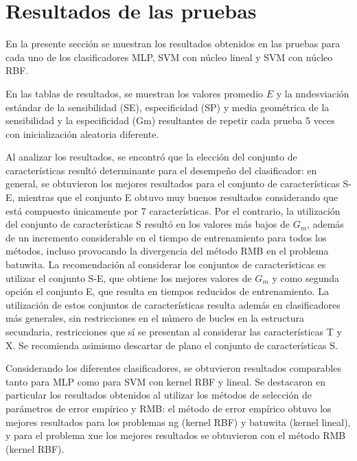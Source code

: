 \documentclass[12pt,bibliography=oldstyle,DIV=12,parskip=half-]{scrreprt}
\begin{document}
%
%
%
\section{Resultados de las pruebas}
%
En la presente sección se muestran los resultados obtenidos en las
pruebas para cada uno de los clasificadores MLP, SVM con núcleo lineal
y SVM con núcleo RBF.

En las tablas de resultados, se muestran los valores promedio $E$ y la
nndesviación estándar de la sensibilidad (SE), especificidad (SP) y
media geométrica de la sensibilidad y la especificidad (Gm)
resultantes de repetir cada prueba 5 veces con inicialización
aleatoria diferente.

Al analizar los resultados, se encontró que la elección del conjunto
de características resultó determinante para
el desempeño del clasificador: en general, se obtuvieron los mejores
resultados para el conjunto de características S-E,
mientras que el conjunto E obtuvo muy buenos resultados considerando
que está compuesto únicamente por 7 características.
Por el contrario, la utilización del conjunto de características S
resultó en los valores más bajos de $G_m$, además de un incremento
considerable en el tiempo de entrenamiento para todos los métodos,
incluso provocando la divergencia del método RMB en el problema
batuwita.
La recomendación al considerar los conjuntos de características es
utilizar el conjunto S-E, que obtiene los mejores valores de $G_m$ y
como segunda opción el conjunto E, que resulta en tiempos reducidos de
entrenamiento.  La utilización de estos conjuntos de características
resulta además en clasificadores más generales, sin restricciones en
el número de bucles en la estructura secundaria, restricciones que sí
se presentan al considerar las características T y X.  Se recomienda
asimismo descartar de plano el conjunto de características S.

Considerando los diferentes clasificadores, se obtuvieron resultados
comparables tanto para MLP como para SVM con kernel RBF y lineal.  Se
destacaron en particular los resultados obtenidos al utilizar los
métodos de selección de parámetros de error empírico y RMB: el método
de error empírico obtuvo los mejores resultados para los problemas ng
(kernel RBF) y batuwita (kernel lineal), y para el problema
xue los mejores resultados se obtuvieron con el método RMB (kernel
RBF).


%
%
\end{document}
